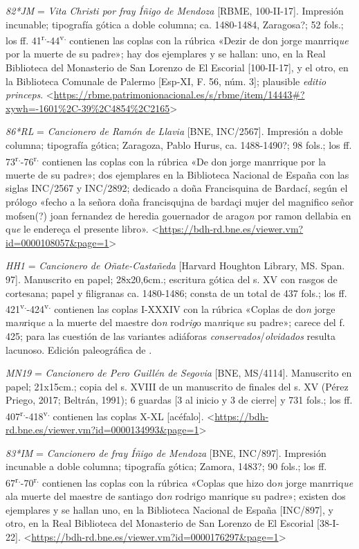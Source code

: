 \documentclass[11pt,a4paper,twoside]{article}
\newcommand{\comillas}[1]{«#1»}
\newcommand{\tsup}[1]{\textsuperscript{#1}}
\begin{document}
\textit{82*JM} = \textit{Vita Christi por fray Íñigo de Mendoza} [RBME, 100-II-17].
%
Impresión incunable; tipografía gótica a doble columna; ca. 1480-1484, Zaragosa?; 52 fols.; los ff. 41\tsup{r.}-44\tsup{v.} contienen las coplas con la rúbrica \comillas{Dezir de don jorge manrriq\textit{ue} por la muerte de su padre}; hay dos ejemplares y se hallan: uno, en la Real Biblioteca del Monasterio de San Lorenzo de El Escorial [100-II-17], y el otro, en la Biblioteca Comunale de Palermo [Esp-XI, F. 56, núm. 3]; plausible \textit{editio princeps}. <\url{https://rbme.patrimonionacional.es/s/rbme/item/14443#?xywh=-1601%2C-39%2C4854%2C2165}>

\textit{86*RL} = \textit{Cancionero de Ramón de Llavia} [BNE, INC/2567].
%
Impresión a doble columna; tipografía gótica; Zaragoza, Pablo Hurus, ca. 1488-1490?; 98 fols.; los ff. 73\tsup{r.}-76\tsup{r.} contienen las coplas con la rúbrica \comillas{De don jorge manrrique por la muerte de su padre}; dos ejemplares en la Biblioteca Nacional de España con las siglas INC/2567 y INC/2892; dedicado a doña Francisquina de Bardací, según el prólogo \comillas{fecho a la señora doña francisqujna de bardaçi mujer del magnifico señor mofsen(?) joan fernandez de heredia gouernador de arago\textit{n} por ramon dellabia en q\textit{ue} le endereça el presente libro}. <\url{https://bdh-rd.bne.es/viewer.vm?id=0000108057&page=1}>

\textit{HH1} = \textit{Cancionero de Oñate-Castañeda} [Harvard Houghton Library, MS. Span. 97].
%
Manuscrito en papel; 28x20,6cm.; escritura gótica del s. XV con rasgos de cortesana; papel y filigranas ca. 1480-1486; consta de un total de 437 fols.; los ff. 421\tsup{v.}-424\tsup{v.} contienen las coplas I-XXXIV con la rúbrica \comillas{Coplas de do\textit{n} jorge ma\textit{n}riq\textit{ue} a la muerte del maestre do\textit{n} rod\textit{rig}o ma\textit{n}riq\textit{ue} su padre}; carece del f. 425; para las cuestión de las variantes adiáforas \textit{conservados}/\textit{olvidados} resulta lacunoso. Edición paleográfica de \textcite{Severin1990}.

\textit{MN19} = \textit{Cancionero de Pero Guillén de Segovia} [BNE, MS/4114].
%
Manuscrito en papel; 21x15cm.; copia del s. XVIII de un manuscrito de finales del s. XV (Pérez Priego, 2017; Beltrán, 1991); 6 guardas [3 al inicio y 3 de cierre] y 731 fols.; los ff. 407\tsup{r.}-418\tsup{v.} contienen las coplas X-XL [acéfalo]. <\url{https://bdh-rd.bne.es/viewer.vm?id=0000134993&page=1}>

\textit{83*IM} = \textit{Cancionero de fray Íñigo de Mendoza} [BNE, INC/897].
%
Impresión incunable a doble columna; tipografía gótica; Zamora, 1483?; 90 fols.; los ff. 67\tsup{r.}-70\tsup{r.} contienen las coplas con la rúbrica \comillas{Coplas que hizo do\textit{n} jorge manrriq\textit{ue} ala muerte del maestre de santiago do\textit{n} rodrigo manrique su padre}; existen dos ejemplares y se hallan uno, en la Biblioteca Nacional de España [INC/897], y otro, en la Real Biblioteca del Monasterio de San Lorenzo de El Escorial [38-I-22]. <\url{https://bdh-rd.bne.es/viewer.vm?id=0000176297&page=1}>
\end{document}
